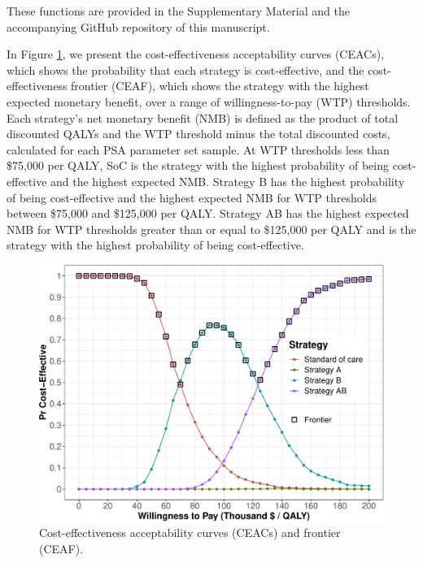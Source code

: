 \documentclass[
]{article}
\begin{document}
These functions are provided in the Supplementary Material and the accompanying GitHub repository of this manuscript.

In Figure \ref{fig:CEAC}, we present the cost-effectiveness acceptability curves (CEACs), which shows the probability that each strategy is cost-effective, and the cost-effectiveness frontier (CEAF), which shows the strategy with the highest expected monetary benefit, over a range of willingness-to-pay (WTP) thresholds. Each strategy's net monetary benefit (NMB) is defined as the product of total discounted QALYs and the WTP threshold minus the total discounted costs, calculated for each PSA parameter set sample. At WTP thresholds less than \$75,000 per QALY, SoC is the strategy with the highest probability of being cost-effective and the highest expected NMB. Strategy B has the highest probability of being cost-effective and the highest expected NMB for WTP thresholds between \$75,000 and \$125,000 per QALY. Strategy AB has the highest expected NMB for WTP thresholds greater than or equal to \$125,000 per QALY and is the strategy with the highest probability of being cost-effective.

\begin{figure}[H]

{\centering \includegraphics{figs/CEAC-1} 

}

\caption{Cost-effectiveness acceptability curves (CEACs) and frontier (CEAF).}\label{fig:CEAC}
\end{figure}
\end{document}
